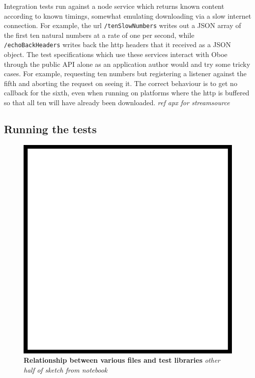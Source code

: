 \documentclass[]{article}
\makeatletter
\def\maxwidth{\ifdim\Gin@nat@width>\linewidth\linewidth
\else\Gin@nat@width\fi}
\let\Oldincludegraphics\includegraphics
\renewcommand{\includegraphics}[1]{\Oldincludegraphics[width=\maxwidth]{#1}}
\makeatother
\begin{document}
Integration tests run against a node service which returns known content
according to known timings, somewhat emulating downloading via a slow
internet connection. For example, the url \texttt{/tenSlowNumbers}
writes out a JSON array of the first ten natural numbers at a rate of
one per second, while \texttt{/echoBackHeaders} writes back the http
headers that it received as a JSON object. The test specifications which
use these services interact with Oboe through the public API alone as an
application author would and try some tricky cases. For example,
requesting ten numbers but registering a listener against the fifth and
aborting the request on seeing it. The correct behaviour is to get no
callback for the sixth, even when running on platforms where the http is
buffered so that all ten will have already been downloaded. \emph{ref
apx for streamsource}

\subsection{Running the tests}

\begin{figure}[htbp]
\centering
\includegraphics{images/placeholder.png}
\caption{\textbf{Relationship between various files and test libraries}
\emph{other half of sketch from notebook}}
\end{figure}
\end{document}
